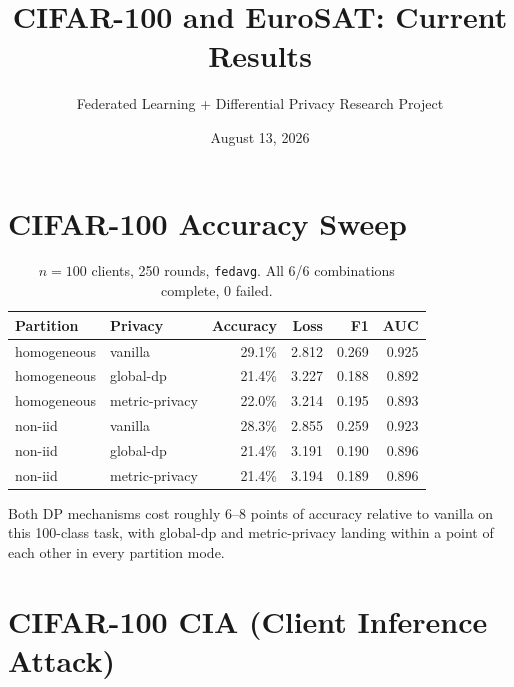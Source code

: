 \documentclass[11pt]{article}
\title{\textbf{CIFAR-100 and EuroSAT: Current Results}}
\author{Federated Learning + Differential Privacy Research Project}
\date{August 13, 2026}
\newcommand{\code}[1]{\texttt{#1}}
\begin{document}
\maketitle

\section*{CIFAR-100 Accuracy Sweep}

\begin{table}[h!]
\centering
\begin{tabular}{llrrrr}
\toprule
Partition & Privacy & Accuracy & Loss & F1 & AUC \\
\midrule
homogeneous & vanilla & 29.1\% & 2.812 & 0.269 & 0.925 \\
homogeneous & global-dp & 21.4\% & 3.227 & 0.188 & 0.892 \\
homogeneous & metric-privacy & 22.0\% & 3.214 & 0.195 & 0.893 \\
non-iid & vanilla & 28.3\% & 2.855 & 0.259 & 0.923 \\
non-iid & global-dp & 21.4\% & 3.191 & 0.190 & 0.896 \\
non-iid & metric-privacy & 21.4\% & 3.194 & 0.189 & 0.896 \\
\bottomrule
\end{tabular}
\caption*{$n=100$ clients, 250 rounds, \code{fedavg}. All 6/6 combinations complete, 0 failed.}
\end{table}

\noindent
Both DP mechanisms cost roughly 6--8 points of accuracy relative to vanilla on this 100-class
task, with global-dp and metric-privacy landing within a point of each other in every partition
mode.

\section*{CIFAR-100 CIA (Client Inference Attack)}
\end{document}
